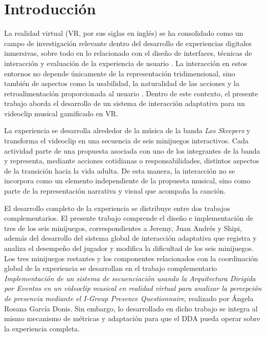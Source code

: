\chapter{Introducción}

La realidad virtual (VR, por sus siglas en inglés) se ha 
consolidado como un campo de investigación relevante dentro del 
desarrollo de experiencias digitales inmersivas, sobre todo en lo
relacionado con el diseño de interfaces, técnicas de interacción
y evaluación de la experiencia de usuario \cite{chen2024interfaces}. 
La interacción en estos entornos no depende únicamente de la 
representación tridimensional, sino también de aspectos como la 
usabilidad, la naturalidad de las acciones y la retroalimentación 
proporcionada al usuario 
\cite{chen2024interfaces,spittle2023interaction,yeo2024interfaces}. 
Dentro de este contexto, el presente trabajo aborda el desarrollo de un 
sistema de interacción adaptativa para un videoclip musical gamificado en VR.

La experiencia se desarrolla alrededor de la música de la banda 
\textit{Los Skeepers} y transforma el videoclip en una secuencia de seis 
minijuegos interactivos. Cada actividad parte de una propuesta asociada 
con uno de los integrantes de la banda y representa, mediante acciones 
cotidianas o responsabilidades, distintos aspectos de la transición 
hacia la vida adulta. De esta manera, la interacción no se incorpora como 
un elemento independiente de la propuesta musical, sino como parte de la 
representación narrativa y visual que acompaña la canción.

El desarrollo completo de la experiencia se distribuye entre dos trabajos 
complementarios. El presente trabajo comprende el diseño e implementación 
de tres de los seis minijuegos, correspondientes a Jeremy, Juan Andrés y 
Shipi, además del desarrollo del sistema global de interacción adaptativa 
que registra y analiza el desempeño del jugador y modifica la dificultad 
de los seis minijuegos. Los tres minijuegos restantes y los componentes
relacionados con la coordinación global de la experiencia se desarrollan 
en el trabajo complementario \textit{Implementación de un sistema de 
secuenciación usando la Arquitectura Dirigida por Eventos en un 
videoclip musical en realidad virtual para analizar la percepción de 
presencia mediante el I-Group Presence Questionnaire}, realizado por 
Ángela Rosana García Donis. Sin embargo, lo desarrollado en dicho trabajo
se integra al mismo mecanismo de métricas y adaptación para que el DDA 
pueda operar sobre la experiencia completa.

